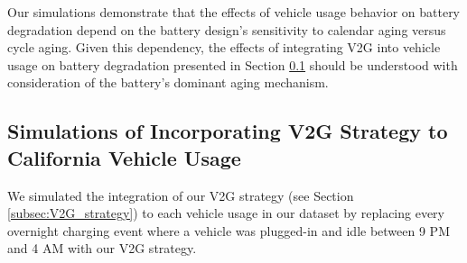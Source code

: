 \documentclass[pdflatex,sn-nature]{sn-jnl}%
\theoremstyle{thmstyleone}%
\theoremstyle{thmstyletwo}%
\theoremstyle{thmstylethree}%
\begin{document}





Our simulations demonstrate that the effects of vehicle usage behavior on battery degradation depend on the battery design's sensitivity to calendar aging versus cycle aging. Given this dependency, the effects of integrating V2G into vehicle usage on battery degradation presented in Section \ref{subsec:V2G_simulations} should be understood with consideration of the battery's dominant aging mechanism. 








\subsection{Simulations of Incorporating V2G Strategy to California Vehicle Usage}
\label{subsec:V2G_simulations}

We simulated the integration of our V2G strategy (see Section \ref{subsec:V2G_strategy}) to each vehicle usage in our dataset by replacing every overnight charging event where a vehicle was plugged-in and idle between 9 PM and 4 AM with our V2G strategy. 
\end{document}

